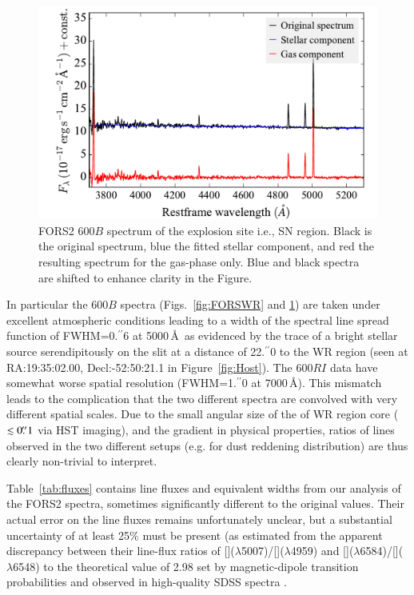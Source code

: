 \documentclass[traditabstract]{aa}
\newcommand{\farc}{\hbox{$.\!\!^{\prime\prime}$}}
\newcommand{\oiii}{[\ion{O}{iii}]}
\newcommand{\nii}{[\ion{N}{ii}]}
\begin{document}
\begin{appendix}
\begin{figure}
\includegraphics[angle=0, width=0.93\columnwidth]{Figs/FORS2_3700_5300_starlight.pdf}
\caption{FORS2 600$B$ spectrum of the explosion site i.e., SN region. Black is the original spectrum, blue the fitted stellar component, and red the resulting spectrum for the gas-phase only. Blue and black spectra are shifted to enhance clarity in the Figure.}
\label{fig:FORSSN}
\end{figure}

In particular the 600$B$ spectra (Figs.~\ref{fig:FORSWR} and \ref{fig:FORSSN}) are taken under excellent atmospheric conditions leading to a width of the spectral line spread function of FWHM=0\farc{6} at 5000\,\AA\, as evidenced by the trace of a bright stellar source serendipitously on the slit at a distance of 22\farc{0} to the WR region (seen at RA:19:35:02.00, Decl:-52:50:21.1 in Figure~\ref{fig:Host}). The 600$RI$ data have somewhat worse spatial resolution (FWHM=1\farc{0} at 7000\,\AA). This mismatch leads to the complication that the two different spectra are convolved with very different spatial scales. Due to the small angular size of the of WR region core ($\lesssim 0\farc{1}$ via HST imaging), and the gradient in physical properties, ratios of lines observed in the two different setups (e.g. for dust reddening distribution) are thus clearly non-trivial to interpret.

Table~\ref{tab:fluxes} contains line fluxes and equivalent widths from our analysis of the FORS2 spectra, sometimes significantly different to the original \citet{2006A&A...454..103H} values. Their actual error on the line fluxes remains unfortunately unclear, but a substantial uncertainty of at least 25\% must be present (as estimated from the apparent discrepancy between their line-flux ratios of \oiii($\lambda$5007)/\oiii($\lambda$4959) and \nii($\lambda$6584)/\nii($\lambda$6548) to the theoretical value of 2.98 set by magnetic-dipole transition probabilities and observed in high-quality SDSS spectra \citep[e.g.][]{2000MNRAS.312..813S, 2006agna.book.....O, 2016MNRAS.459.3475W}.


\end{appendix}
\end{document}
